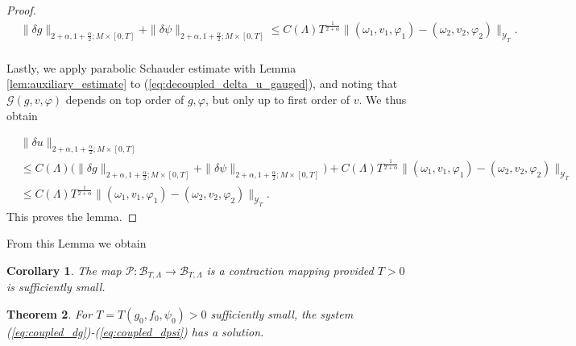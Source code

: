 \documentclass{amsart}
\newtheorem{theorem}{Theorem}[section]
\newtheorem{corollary}[theorem]{Corollary}
\theoremstyle{definition}
\theoremstyle{remark}
\numberwithin{equation}{section}
\begin{document}
\begin{proof}
\begin{equation}\label{estimate:delta_g_and_psi}
	\begin{aligned}
	&\|\delta g\|_{2+\alpha,1+\frac{\alpha}{2};M\times[0,T]} + \|\delta \psi\|_{2+\alpha,1+\frac{\alpha}{2};M\times[0,T]}\leq C(\Lambda) T^{\frac{1}{2+\alpha}}\|(\omega_1,v_1,\varphi_1) - (\omega_2,v_2,\varphi_2)\|_{\mathcal{Y}_T}.\\[1ex]
	\end{aligned}
\end{equation}

Lastly, we apply parabolic Schauder estimate with Lemma \ref{lem:auxiliary_estimate} to (\ref{eq:decoupled_delta_u_gauged}), and noting that $\mathcal{G}(g,v,\varphi)$ depends on top order of $g,\varphi$, but only up to first order of $v$. We thus obtain

\begin{equation}\label{estimate:delta_u}
	\begin{aligned}
		&\|\delta u\|_{2+\alpha,1+\frac{\alpha}{2};M\times[0,T]} \\[1ex]
		&\leq C(\Lambda) 	\Big( \|\delta g\|_{2+\alpha,1+\frac{\alpha}{2};M\times[0,T]} + \|\delta \psi\|_{2+\alpha,1+\frac{\alpha}{2};M\times[0,T]}\Big) + C(\Lambda) T^{\frac{1}{2+\alpha}}\|(\omega_1,v_1,\varphi_1) - (\omega_2,v_2,\varphi_2)\|_{\mathcal{Y}_T}\\[1ex]
		&\leq C(\Lambda) T^{\frac{1}{2+\alpha}}\|(\omega_1,v_1,\varphi_1) - (\omega_2,v_2,\varphi_2)\|_{\mathcal{Y}_T}.
	\end{aligned}
\end{equation}
This proves the lemma.

\end{proof}
From this Lemma we obtain

\begin{corollary}
	The map $\mathcal{P} :\mathcal{B}_{T,\Lambda} \to \mathcal{B}_{T,\Lambda}$ is a contraction mapping  provided $T>0$ is sufficiently small.
\end{corollary}

\medskip

\begin{theorem}
	For $T = T(g_0, f_0,\psi_0)>0$ sufficiently small, the system (\ref{eq:coupled_dg})-(\ref{eq:coupled_dpsi}) has a solution.
\end{theorem}
\end{document}

